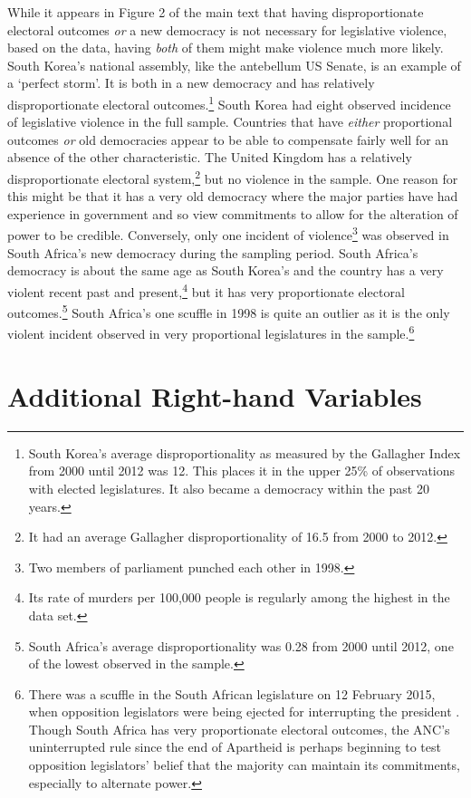 \documentclass[a4paper]{article}\usepackage[]{graphicx}\usepackage[]{color}
\begin{document}
While it appears in Figure 2 of the main text that having disproportionate electoral outcomes \emph{or} a new democracy is not necessary for legislative violence, based on the data, having \emph{both} of them might make violence much more likely. South Korea's national assembly, like the antebellum US Senate, is an example of a `perfect storm'. It is both in a new democracy and has relatively disproportionate electoral outcomes.\footnote{South Korea’s average disproportionality as measured by the Gallagher Index \citep{Gallagher1991} from 2000 until 2012 was 12. This places it in the upper 25\% of observations with elected legislatures. It also became a democracy within the past 20 years.} South Korea had eight observed incidence of legislative violence in the full sample. Countries that have \emph{either} proportional outcomes \emph{or} old democracies appear to be able to compensate fairly well for an absence of the other characteristic. The United Kingdom has a relatively disproportionate electoral system,\footnote{It had an average Gallagher disproportionality of 16.5 from 2000 to 2012.} but no violence in the sample. One reason for this might be that it has a very old democracy where the major parties have had experience in government and so view commitments to allow for the alteration of power to be credible. Conversely, only one incident of violence\footnote{Two members of parliament punched each other in 1998.} was observed in South Africa's new democracy during the sampling period. South Africa's democracy is about the same age as South Korea's and the country has a very violent recent past and present,\footnote{Its rate of murders per 100,000 people is regularly among the highest in the \cite{UNMurder2013} data set.} but it has very proportionate electoral outcomes.\footnote{South Africa’s average disproportionality was 0.28 from 2000 until 2012, one of the lowest observed in the sample.} South Africa's one scuffle in 1998 is quite an outlier as it is the only violent incident observed in very proportional legislatures in the sample.\footnote{There was a scuffle in the South African legislature on 12 February 2015, when opposition legislators were being ejected for interrupting the president \citep{Guardian2015}. Though South Africa has very proportionate electoral outcomes, the ANC's uninterrupted rule since the end of Apartheid is perhaps beginning to test opposition legislators' belief that the majority can maintain its commitments, especially to alternate power.}

\section*{Additional Right-hand Variables}
\end{document}
